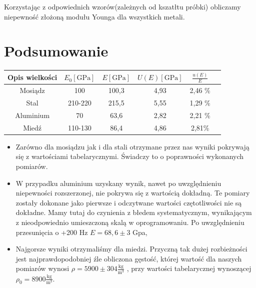 \documentclass [a4paper,11pt]{article}
\begin{document}
	Korzystając z odpowiednich wzorów(zależnych od kszatłtu próbki) obliczamy niepewność złożoną modułu Younga dla wszystkich metali. 

		

	\section{Podsumowanie}
	\begin{center}
		\begin{tabular}{|c|c|c|c|c|c|}
			\hline Opis wielkości & $ E_0 \left[ \text{GPa} \right]$ & $E \left[ \text{GPa} \right]$ & $U(E) \left[ \text{GPa} \right]$ & $ \frac{u(E)}{E} $\\
			\hline Mosiądz  & 100 &  100,3& 4,93 & 2,46 \%  \\
			\hline Stal & 210-220 & 215,5 & 5,55 & 1,29 \%  \\  
			\hline Aluminium& 70 &  63,6&2,82  &  2,21 \%  \\ 
			\hline  Miedź& 110-130 & 86,4  &  4,86 & 2,81\% \\ 
			\hline 
		\end{tabular} 
	\end{center}
\vspace{1em}

\begin{itemize}
	\item Zarówno dla mosiądzu jak i dla stali otrzymane przez nas wyniki pokrywają się z wartościami tabelarycznymi. Świadczy to o poprawności wykonanych pomiarów.
	
	\item W przypadku aluminium uzyskany wynik, nawet po uwzględnieniu niepewności rozszerzonej, nie pokrywa się z wartością dokładną. Te pomiary zostały dokonane jako pierwsze i odczytwane wartości czętotliwości nie są dokładne. Mamy tutaj do czynienia z błedem systematycznym, wynikającym z nieodpowiednio umieszczoną skalą w oprogramowaniu. Po uwzględnieniu przesunięcia o +200 Hz $E=68,6 \pm 3 $ Gpa, %
	
	\item Najgorsze wyniki otrzymaliśmy dla miedzi. Przyczną tak dużej rozbieżności jest najprawdopodobniej źle obliczona gęstość, której wartość dla naszych pomiarów wynosi $\rho=5900 \pm 304 \mathrm{\frac{kg}{m^3}}$  , przy wartości tabelarycznej wynoszącej $\rho_0= 8900 \mathrm{\frac{kg}{m^3}}$. %
\end{itemize}
\end{document}
